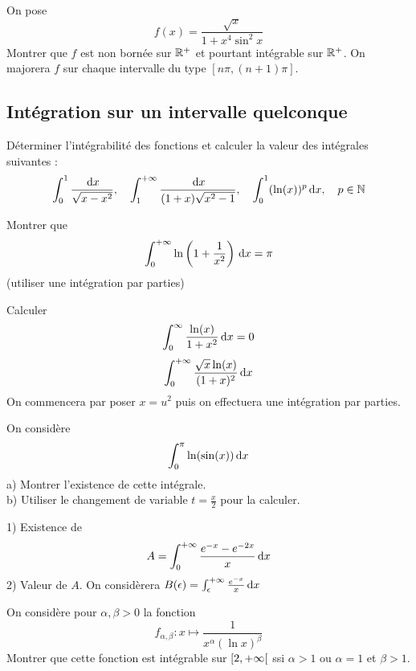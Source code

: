\begin{exercice}
On pose
$$ f(x)=\frac{\sqrt{x}}{1+x^{4}\sin^{2}x} $$
Montrer que $f$ est non bornée sur $\mathbb{R}^{+}$ et pourtant intégrable sur $\mathbb{R}^{+}$.
On majorera $f$ sur chaque intervalle du type $[n\pi,(n+1)\pi]$.
\end{exercice}

\subsection{Intégration sur un intervalle quelconque}

\begin{exercice}
Déterminer l'intégrabilité des fonctions et calculer la valeur des intégrales suivantes :
$$ \int_{0}^{1}\frac{\,\mathrm{d}x}{\sqrt{x-x^{2}}}, \quad \int_{1}^{+\infty}\frac{\,\mathrm{d}x}{(1+x)\sqrt{x^{2}-1}}, \quad \int_{0}^{1}(\ln(x))^{p}\,\mathrm{d}x, \quad p\in\mathbb{N} $$
\end{exercice}

\begin{exercice}
Montrer que
$$ \int_{0}^{+\infty}\ln\left(1+\frac{1}{x^{2}}\right)\,\mathrm{d}x = \pi $$
(utiliser une intégration par parties)
\end{exercice}

\begin{exercice}
Calculer
$$ \int_{0}^{\infty}\frac{\ln(x)}{1+x^{2}}\,\mathrm{d}x=0 $$
$$ \int_{0}^{+\infty}\frac{\sqrt{x}\ln(x)}{(1+x)^{2}}\,\mathrm{d}x $$
On commencera par poser $x=u^{2}$ puis on effectuera une intégration par parties.
\end{exercice}

\begin{exercice}
On considère
$$ \int_{0}^{\pi}\ln(\sin(x))\,\mathrm{d}x $$
a) Montrer l'existence de cette intégrale. \\
b) Utiliser le changement de variable $t=\frac{x}{2}$ pour la calculer.
\end{exercice}

\begin{exercice}
1) Existence de
$$ A=\int_{0}^{+\infty}\frac{e^{-x}-e^{-2x}}{x}\,\mathrm{d}x $$
2) Valeur de $A$. On considèrera $B(\epsilon)=\int_{\epsilon}^{+\infty}\frac{e^{-x}}{x}\,\mathrm{d}x$
\end{exercice}

\begin{exercice}
On considère pour $\alpha,\beta>0$ la fonction
$$ f_{\alpha,\beta}:x\mapsto\frac{1}{x^{\alpha}(\ln x)^{\beta}} $$
Montrer que cette fonction est intégrable sur $\left[2, +\infty\right[$ ssi $\alpha>1$ ou $\alpha=1$ et $\beta>1$.
\end{exercice}

